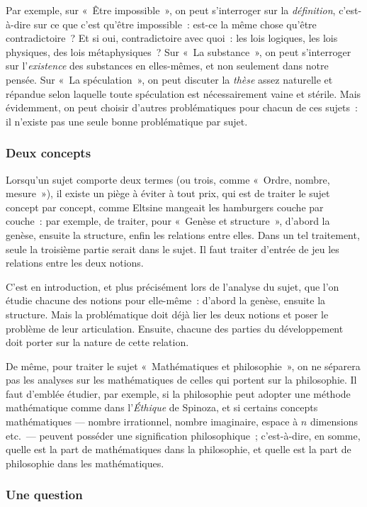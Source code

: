 \documentclass[a4paper]{article}
\begin{document}
Par exemple, sur « Être impossible », on peut s'interroger sur la
\emph{définition}, c'est-à-dire sur ce que c'est qu'être impossible : est-ce
la même chose qu'être contradictoire ? Et si oui, contradictoire avec
quoi : les lois logiques, les lois physiques, des lois métaphysiques ?
Sur « La substance », on peut s'interroger sur l'\emph{existence} des
substances en elles-mêmes, et non seulement dans notre pensée. Sur « La
spéculation », on peut discuter la \emph{thèse} assez naturelle et répandue
selon laquelle toute spéculation est nécessairement vaine et stérile.
Mais évidemment, on peut choisir d'autres problématiques pour chacun de
ces sujets : il n'existe pas une seule bonne problématique par sujet.

\subsubsection{Deux concepts}
\label{sec-2-3-2}

Lorsqu'un sujet comporte deux termes (ou trois, comme « Ordre, nombre,
mesure »), il existe un piège à éviter à tout prix, qui est de traiter le
sujet concept par concept, comme Eltsine mangeait les hamburgers couche
par couche : par exemple, de traiter, pour « Genèse et structure »,
d'abord la genèse, ensuite la structure, enfin les relations entre
elles. Dans un tel traitement, seule la troisième partie serait dans le
sujet. Il faut traiter d'entrée de jeu les relations entre les deux
notions.

C'est en introduction, et plus précisément lors de l'analyse du sujet,
que l'on étudie chacune des notions pour elle-même : d'abord la genèse,
ensuite la structure. Mais la problématique doit déjà lier les deux
notions et poser le problème de leur articulation. Ensuite, chacune des
parties du développement doit porter sur la nature de cette relation.

De même, pour traiter le sujet « Mathématiques et philosophie », on ne
séparera pas les analyses sur les mathématiques de celles qui portent
sur la philosophie. Il faut d'emblée étudier, par exemple, si la
philosophie peut adopter une méthode mathématique comme dans l'\emph{Éthique}
de Spinoza, et si certains concepts mathématiques --- nombre
irrationnel, nombre imaginaire, espace à $n$ dimensions etc. --- peuvent
posséder une signification philosophique ; c'est-à-dire, en somme,
quelle est la part de mathématiques dans la philosophie, et quelle est
la part de philosophie dans les mathématiques.

\subsubsection{Une question}
\label{sec-2-3-3}
\end{document}

